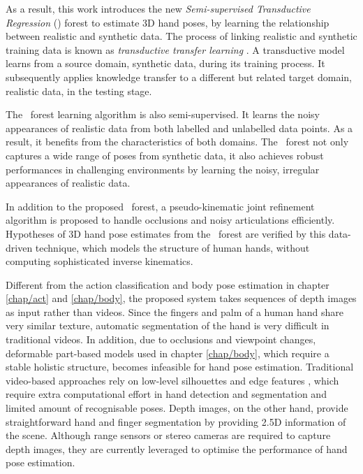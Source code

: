 As a result, this work introduces the new \emph{Semi-supervised Transductive Regression} (\STR) forest to estimate 3D hand poses, by learning the relationship between realistic and synthetic data. 
The process of linking realistic and synthetic training data is known as \emph{transductive transfer learning} \cite{Pan2010}.  
A transductive model learns from a source domain, \eg synthetic data, during its training process.
It subsequently applies knowledge transfer to a different but related target domain, \eg realistic data, in the testing stage. 

The \STR\ forest learning algorithm is also semi-supervised. 
It learns the noisy appearances of realistic data from both labelled and unlabelled data points. 
As a result, it benefits from the characteristics of both domains. 
The \STR\ forest not only captures a wide range of poses from synthetic data, it also achieves robust performances in challenging environments by learning the noisy, irregular appearances of realistic data. 

In addition to the proposed \STR\ forest, a pseudo-kinematic joint refinement algorithm is proposed to handle occlusions and noisy articulations efficiently. 
Hypotheses of 3D hand pose estimates from the \STR\ forest are verified by this data-driven technique, which models the structure of human hands, without computing sophisticated inverse kinematics. 

Different from the action classification and body pose estimation in chapter \ref{chap/act} and \ref{chap/body}, the proposed system takes sequences of depth images as input rather than videos. 
Since the fingers and palm of a human hand share very similar texture, automatic segmentation of the hand is very difficult in traditional videos. 
In addition, due to occlusions and viewpoint changes, deformable part-based models used in chapter \ref{chap/body}, which require a stable holistic structure, becomes infeasible for hand pose estimation.   
Traditional video-based approaches rely on low-level silhouettes and edge features \cite{Rosales2001, Chua2002, Athitsos2003, Stenger2006}, which require extra computational effort in hand detection and segmentation and limited amount of recognisable poses.   
Depth images, on the other hand, provide straightforward hand and finger segmentation by providing 2.5D information of the scene. 
Although range sensors or stereo cameras are required to capture depth images, they are currently leveraged to optimise the performance of hand pose estimation. 


